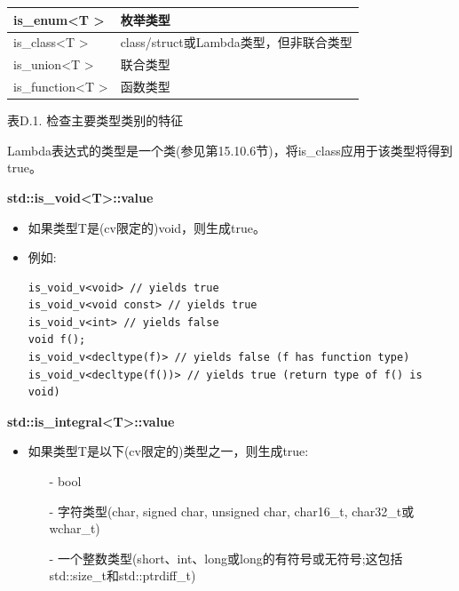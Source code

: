 \begin{table}[H]
\begin{tabular}{|l|l|}
		is\_enum\textless{}T \textgreater{}                      & 枚举类型                                                                         \\ \hline
		is\_class\textless{}T \textgreater{}                     & class/struct或Lambda类型，但非联合类型                                                               \\ \hline
		is\_union\textless{}T \textgreater{}                     & 联合类型                                                                                                    \\ \hline
		is\_function\textless{}T \textgreater{}                  & 函数类型                                                                                                  \\ \hline
	\end{tabular}
\end{table}

\begin{center}
表D.1. 检查主要类型类别的特征
\end{center}

Lambda表达式的类型是一个类(参见第15.10.6节)，将is\_class应用于该类型将得到true。

\textbf{std::is\_void<T>::value}

\begin{itemize}
\item 
如果类型T是(cv限定的)void，则生成true。

\item 
例如:
\begin{lstlisting}[style=styleCXX]
is_void_v<void> // yields true
is_void_v<void const> // yields true
is_void_v<int> // yields false
void f();
is_void_v<decltype(f)> // yields false (f has function type)
is_void_v<decltype(f())> // yields true (return type of f() is void)
\end{lstlisting}

\end{itemize}

\textbf{std::is\_integral<T>::value}

\begin{itemize}
\item 
如果类型T是以下(cv限定的)类型之一，则生成true:

\begin{itemize}
\item [-]
bool

\item [-]
字符类型(char, signed char, unsigned char, char16\_t, char32\_t或wchar\_t)

\item [-]
一个整数类型(short、int、long或long的有符号或无符号;这包括std::size\_t和std::ptrdiff\_t)
\end{itemize}

\end{itemize}

